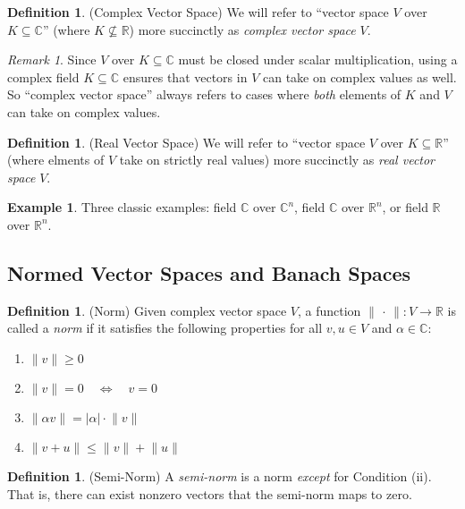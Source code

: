 \documentclass[12pt]{article}
\numberwithin{equation}{section} %
\theoremstyle{plain}
\theoremstyle{definition}
\newtheorem{defn}[thm]{Definition}
\newtheorem{ex}[thm]{Example}
\theoremstyle{remark}
\newtheorem*{rmk}{Remark}
\newcommand{\R}{\mathbb{R}}
\newcommand{\Rn}{\mathbb{R}^n}
\newcommand{\C}{\mathbb{C}}
\newcommand{\Cn}{\mathbb{C}^n}
\begin{document}
\begin{defn}(Complex Vector Space)
We will refer to ``vector space $V$ over $K\subseteq\C$'' (where
$K\not\subseteq\R$) more succinctly as \emph{complex vector space} $V$.
\end{defn}

\begin{rmk}
Since $V$ over $K\subseteq\C$ must be closed under scalar
multiplication, using a complex field $K\subseteq\C$ ensures that
vectors in $V$ can take on complex values as well. So ``complex vector
space'' always refers to cases where \emph{both} elements of $K$ and $V$
can take on complex values.
\end{rmk}

\begin{defn}(Real Vector Space)
We will refer to ``vector space $V$ over $K\subseteq\R$'' (where elments
of $V$ take on strictly real values) more succinctly as
\emph{real vector space} $V$.
\end{defn}

\begin{ex}
Three classic examples: field $\C$ over $\Cn$, field $\C$ over $\Rn$, or
field $\R$ over $\Rn$.
\end{ex}

\clearpage
\subsection{Normed Vector Spaces and Banach Spaces}


\begin{defn}(Norm)
Given complex vector space $V$, a function
$\lVert\,\cdot\,\rVert:V\rightarrow \R$ is called a \emph{norm} if it
satisfies the following properties for all $v,u\in V$ and $\alpha\in
\C$:
\begin{enumerate}[label=(\roman*)]
  \item $\lVert v\rVert\geq 0$
  \item $\lVert v\rVert=0 \quad \iff \quad v=0$
  \item $\lVert \alpha v\rVert= |\alpha| \cdot \lVert v\rVert$
  \item $\lVert v+u\rVert \leq \lVert v\rVert + \lVert u\rVert$
\end{enumerate}
\end{defn}

\begin{defn}(Semi-Norm)
A \emph{semi-norm} is a norm \emph{except} for Condition (ii). That is,
there can exist nonzero vectors that the semi-norm maps to zero.
\end{defn}
\end{document}
